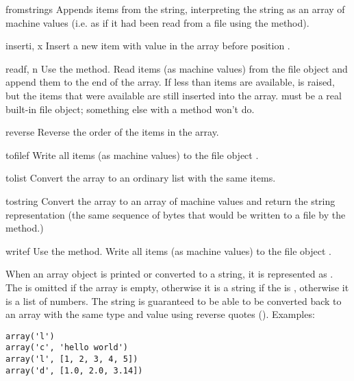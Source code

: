\begin{methoddesc}[array]{fromstring}{s}
Appends items from the string, interpreting the string as an
array of machine values (i.e. as if it had been read from a
file using the  method).
\end{methoddesc}

\begin{methoddesc}[array]{insert}{i, x}
Insert a new item with value  in the array before position
.
\end{methoddesc}

\begin{methoddesc}[array]{read}{f, n}
  {Use the  method.}
Read  items (as machine values) from the file object 
and append them to the end of the array.  If less than  items
are available,  is raised, but the items that were
available are still inserted into the array.   must be a real
built-in file object; something else with a  method won't
do.
\end{methoddesc}

\begin{methoddesc}[array]{reverse}{}
Reverse the order of the items in the array.
\end{methoddesc}

\begin{methoddesc}[array]{tofile}{f}
Write all items (as machine values) to the file object .
\end{methoddesc}

\begin{methoddesc}[array]{tolist}{}
Convert the array to an ordinary list with the same items.
\end{methoddesc}

\begin{methoddesc}[array]{tostring}{}
Convert the array to an array of machine values and return the
string representation (the same sequence of bytes that would
be written to a file by the  method.)
\end{methoddesc}

\begin{methoddesc}[array]{write}{f}
  {Use the  method.}
Write all items (as machine values) to the file object .
\end{methoddesc}

When an array object is printed or converted to a string, it is
represented as .  The
 is omitted if the array is empty, otherwise it is a
string if the  is , otherwise it is a list of
numbers.  The string is guaranteed to be able to be converted back to
an array with the same type and value using reverse quotes
().  Examples:

\begin{verbatim}
array('l')
array('c', 'hello world')
array('l', [1, 2, 3, 4, 5])
array('d', [1.0, 2.0, 3.14])
\end{verbatim}


\begin{seealso}
\end{seealso}
